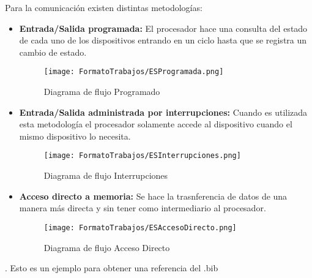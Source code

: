 \documentclass[preprint,12pt]{elsarticle}
\begin{document}
Para la comunicación existen distintas metodologías:
   \begin{itemize}
        \item \textbf{Entrada/Salida programada:} El procesador hace una consulta del estado   de cada uno de los dispositivos entrando en un ciclo hasta que se registra un cambio de estado.\cite{Murdocca:2002}\newline
\begin{figure}[ht!]
\centering\texttt{[image: FormatoTrabajos/ESProgramada.png]}
\caption{Diagrama de flujo Programado}
\label{fig:ESProgramada}
\end{figure}
\newline\newline\newline\newline\newline\newline\newline\newline\newline
        \item \textbf{Entrada/Salida administrada por interrupciones:} Cuando es utilizada esta metodología el procesador solamente accede al dispositivo cuando el mismo dispositivo lo necesita. \cite{Murdocca:2002}
\begin{figure}[ht!]
\centering\texttt{[image: FormatoTrabajos/ESInterrupciones.png]}
\caption{Diagrama de flujo Interrupciones}
\label{fig:ESInterrupciones}
\end{figure}\newline\newline\newline\newline\newline\newline\newline\newline\newline\newline
        \item \textbf{Acceso directo a memoria:} Se hace la trasnferencia de datos de una manera más directa y sin tener como intermediario al procesador. \cite{Murdocca:2002}
        \begin{figure}[ht!]
\centering\texttt{[image: FormatoTrabajos/ESAccesoDirecto.png]}
\caption{Diagrama de flujo Acceso Directo}
\label{fig:ESAccesoDirecto}
\end{figure}\newline\newline\newline\newline\newline\newline\newline\newline\newline\newline
    \end{itemize} \newline
 \cite{Silberschatz:2006}.
Esto es un ejemplo para obtener una referencia del .bib \cite{Smith:2013jd}
\end{document}

